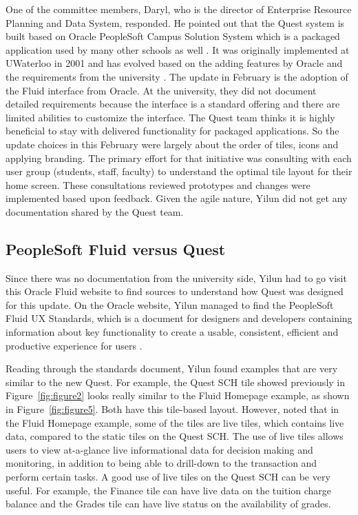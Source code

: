 \documentclass[conference]{IEEEtran}
\begin{document}
One of the committee members, Daryl, who is the director of Enterprise Resource Planning and Data System, responded. He pointed out that the Quest system is built based on Oracle PeopleSoft Campus Solution System which is a packaged application used by many other schools as well \cite{b6}. It was originally implemented at UWaterloo in 2001 and has evolved based on the adding features by Oracle and the requirements from the university \cite{b5}. The update in February is the adoption of the Fluid interface from Oracle. At the university, they did not document detailed requirements because the interface is a standard offering and there are limited abilities to customize the interface. The Quest team thinks it is highly beneficial to stay with delivered functionality for packaged applications. So the update choices in this February were largely about the order of tiles, icons and applying branding. The primary effort for that initiative was consulting with each user group (students, staff, faculty) to understand the optimal tile layout for their home screen. These consultations reviewed prototypes and changes were implemented based upon feedback. Given the agile nature, Yilun did not get any documentation shared by the Quest team.


\subsection{PeopleSoft Fluid versus Quest}
Since there was no documentation from the university side, Yilun had to go visit this Oracle Fluid website to find sources to understand how Quest was designed for this update. On the Oracle website, Yilun managed to find the PeopleSoft Fluid UX Standards, which is a document for designers and developers containing information about key functionality to create a usable, consistent, efficient and productive experience for users \cite{b7}. 

Reading through the standards document, Yilun found examples that are very similar to the new Quest. For example, the Quest SCH tile showed previously in Figure~\ref{fig:figure2} looks really similar to the Fluid Homepage example, as shown in Figure~\ref{fig:figure5}. Both have this tile-based layout. However, noted that in the Fluid Homepage example, some of the tiles are live tiles, which contains live data, compared to the static tiles on the Quest SCH. The use of live tiles allows users to view at-a-glance live informational data for decision making and monitoring, in addition to being able to drill-down to the transaction and perform certain tasks. A good use of live tiles on the Quest SCH can be very useful. For example, the Finance tile can have live data on the tuition charge balance and the Grades tile can have live status on the availability of grades. 
\end{document}
